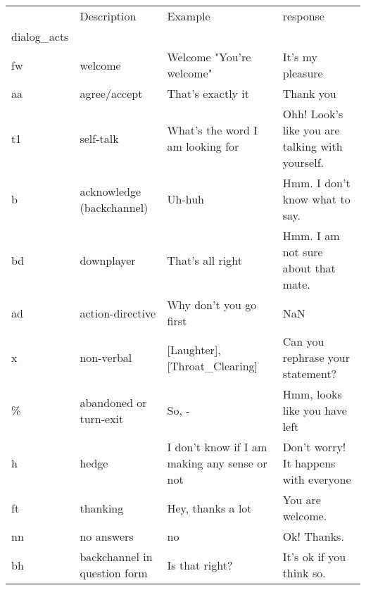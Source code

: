 \begin{tabular}{llll}
\toprule
{} &                   Description &                                          Example &                                           response \\
dialog\_acts &                               &                                                  &                                                    \\
\midrule
fw          &                       welcome &                         Welcome "You're welcome" &                                   It's my pleasure \\
aa          &                  agree/accept &                                That's exactly it &                                          Thank you \\
t1          &                     self-talk &                 What's the word I am looking for &    Ohh! Look's like you are talking with yourself. \\
b           &    acknowledge (backchannel)  &                                           Uh-huh &                     Hmm. I don't know what to say. \\
bd          &                    downplayer &                                 That's all right &                Hmm. I am not sure about that mate. \\
ad          &              action-directive &                           Why don't you go first &                                                NaN \\
x           &                    non-verbal &                     [Laughter],[Throat\_Clearing] &                   Can you rephrase your statement? \\
\%           &        abandoned or turn-exit &                                           So, -  &                      Hmm, looks like you have left \\
h           &                         hedge &     I don't know if I am making any sense or not &              Don't worry! It happens with everyone \\
ft          &                      thanking &                                Hey, thanks a lot &                                   You are welcome. \\
nn          &                    no answers &                                               no &                                        Ok! Thanks. \\
bh          &  backchannel in question form &                                   Is that right? &                           It's ok if you think so. \\

\end{tabular}

